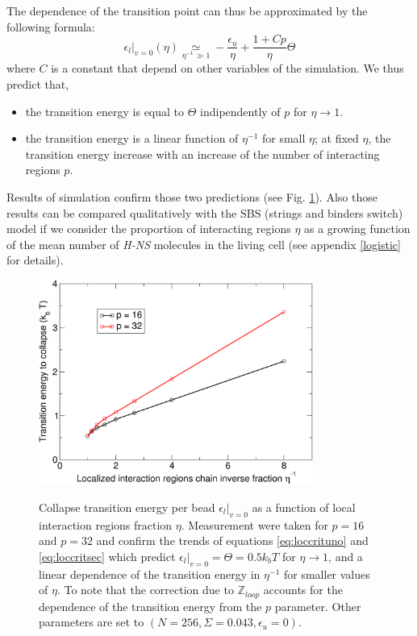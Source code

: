 \documentclass[12pt,a4paper,notitlepage]{article}
\newcommand{\hns}{\emph{H-NS}\xspace}
\begin{document}
The dependence of the transition point can thus be approximated by the
following formula:
\begin{equation}
\left. \epsilon_l \right|_{v = 0} (\eta) 
\underset{\eta^{-1} \gg 1}{\simeq} - \frac{\epsilon_u}{\eta} + 
\frac{1 + C p}{\eta} \Theta
\label{eq:loccritsec}
\end{equation}
where $C$ is a constant that depend on other variables of the
simulation. We thus predict that,
\begin{itemize}
\item
the transition energy is equal to $\Theta$ indipendently of $p$ for
$\eta \to 1$.
\item
the transition energy is a linear function of $\eta^{-1}$ for small
$\eta$; at fixed $\eta$, the transition energy increase with an
increase of the number of interacting regions $p$.
\end{itemize}
Results of simulation confirm those two predictions (see
Fig. \ref{fig:locunicrit}). Also those results can be compared
qualitatively with the SBS (strings and binders switch)
model\cite{Barbieri2012} if we consider the proportion of interacting
regions $\eta$ as a growing function of the mean number of \hns
molecules in the living cell (see appendix \ref{logistic} for
details).
\begin{figure}[h!]
\centering
\includegraphics[width=9cm]{local_unif_critical}\\
\caption{Collapse transition energy per bead $\left. \epsilon_l
  \right|_{v = 0}$ as a function of local interaction regions fraction
  $\eta$. Measurement were taken for $p = 16$ and $p = 32$ and confirm
  the trends of equations \ref{eq:loccrituno} and
  \ref{eq:loccritsec} which predict $\left. \epsilon_l \right|_{v = 0}
  = \Theta = 0.5 k_bT$ for $\eta \to 1$, and a linear 
  dependence of the transition energy in $\eta^{-1}$ for smaller
  values of $\eta$. To note that the correction due to
  $\mathbb{Z}_{loop}$ accounts for the dependence of the transition
  energy from the $p$ parameter. Other parameters are set to $(N =
  256, \Sigma = 0.043, \epsilon_u = 0)$.}
\label{fig:locunicrit}
\end{figure}
\end{document}
